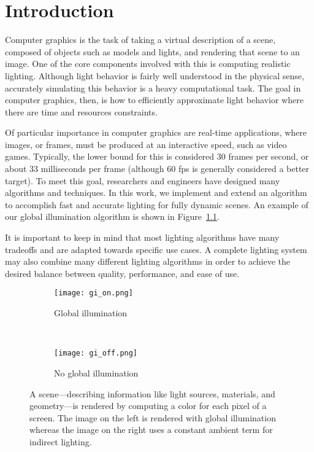 \chapter{Introduction}
Computer graphics is the task of taking a virtual description of a scene, composed of objects such as models and lights, and rendering that scene to an image. One of the core components involved with this is computing realistic lighting. Although light behavior is fairly well understood in the physical sense, accurately simulating this behavior is a heavy computational task. The goal in computer graphics, then, is how to efficiently approximate light behavior where there are time and resources constraints.


Of particular importance in computer graphics are real-time applications, where images, or frames, must be produced at an interactive speed, such as video games. Typically, the lower bound for this is considered 30 frames per second, or about 33 milliseconds per frame (although 60 fps is generally considered a better target). To meet this goal, researchers and engineers have designed many algorithms and techniques.
In this work, we implement and extend an algorithm to accomplish fast and accurate lighting for fully dynamic scenes. An example of our global illumination algorithm is shown in Figure~\ref{fig:introduction_gi}.

It is important to keep in mind that most lighting algorithms have many tradeoffs and are adapted towards specific use cases. A complete lighting system may also combine many different lighting algorithms in order to achieve the desired balance between quality, performance, and ease of use.

\begin{figure}[h]
\centering
    \begin{subfigure}[t]{0.4\textwidth}
        \texttt{[image: gi\_on.png]}
        \caption{Global illumination}
    \end{subfigure}
    ~
    \begin{subfigure}[t]{0.4\textwidth}
        \texttt{[image: gi\_off.png]}
        \caption{No global illumination}
    \end{subfigure}
    \caption{A scene---describing information like light sources, materials, and geometry---is rendered by computing a color for each pixel of a screen. The image on the left is rendered with global illumination whereas the image on the right uses a constant ambient term for indirect lighting.}
    \label{fig:introduction_gi}
\end{figure}

